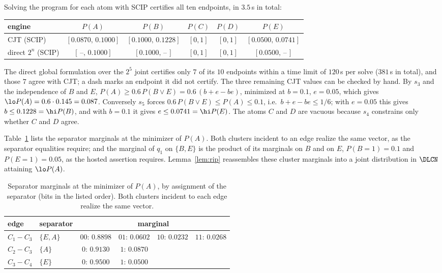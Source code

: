 Solving the program for each atom with SCIP certifies all ten endpoints, in
$3.5$\,s in total:
\begin{center}\small
\begin{tabular}{@{}lccccc@{}}
\toprule
engine & $P(A)$ & $P(B)$ & $P(C)$ & $P(D)$ & $P(E)$ \\
\midrule
\textsc{CJT} (SCIP) & $[0.0870,\,0.1000]$ & $[0.1000,\,0.1228]$ & $[0,1]$ & $[0,1]$ & $[0.0500,\,0.0741]$ \\
direct $2^n$ (SCIP) & $[\,\text{--},\,0.1000]$ & $[0.1000,\,\text{--}\,]$ & $[0,1]$ & $[0,1]$ & $[0.0500,\,\text{--}\,]$ \\
\bottomrule
\end{tabular}
\end{center}
The direct global formulation over the $2^5$ joint certifies only $7$ of its $10$
endpoints within a time limit of $120$\,s per solve ($381$\,s in total), and
those $7$ agree with \textsc{CJT}; a dash marks an endpoint it did not certify.
The three remaining \textsc{CJT} values can be checked by hand. By $s_3$ and the
independence of $B$ and $E$, $P(A)\ge0.6\,P(B\vee E)=0.6\,(b+e-be)$, minimized at
$b=0.1$, $e=0.05$, which gives $\lo P(A)=0.6\cdot0.145=0.087$. Conversely $s_5$
forces $0.6\,P(B\vee E)\le P(A)\le0.1$, i.e.\ $b+e-be\le 1/6$; with $e=0.05$ this
gives $b\le0.1228=\hi P(B)$, and with $b=0.1$ it gives $e\le0.0741=\hi P(E)$. The
atoms $C$ and $D$ are vacuous because $s_4$ constrains only whether $C$ and $D$
agree.

Table~\ref{tab:msgs} lists the separator marginals at the minimizer of $P(A)$.
Both clusters incident to an edge realize the same vector, as the separator
equalities require; and the marginal of $q_1$ on $\{B,E\}$ is the product of its
marginals on $B$ and on $E$, $P(B{=}1)=0.1$ and $P(E{=}1)=0.05$, as the hosted
assertion requires. Lemma~\ref{lem:rip} reassembles these cluster marginals into a
joint distribution in $\DLCN$ attaining $\lo P(A)$.

\begin{table}[ht]\centering\small
\caption{Separator marginals at the minimizer of $P(A)$, by assignment of the
separator (bits in the listed order). Both clusters incident to each edge realize
the same vector.}\label{tab:msgs}
\begin{tabular}{@{}llcccc@{}}
\toprule
edge & separator & \multicolumn{4}{c}{marginal}\\
\midrule
$C_1-C_3$ & $\{E,A\}$ & $00{:}\,0.8898$ & $01{:}\,0.0602$ & $10{:}\,0.0232$ & $11{:}\,0.0268$\\
$C_2-C_3$ & $\{A\}$   & $0{:}\,0.9130$  & $1{:}\,0.0870$  & & \\
$C_3-C_4$ & $\{E\}$   & $0{:}\,0.9500$  & $1{:}\,0.0500$  & & \\
\bottomrule
\end{tabular}
\end{table}

